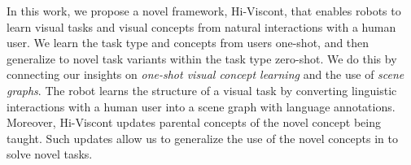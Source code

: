 In this work, we propose a novel framework, Hi-Viscont, that enables robots to learn visual tasks and visual concepts from natural interactions with a human user. We learn the task type and concepts from users one-shot, and then generalize to novel task variants within the task type zero-shot.  
We do this by connecting our insights on \emph{one-shot visual concept learning} and the use of \emph{scene graphs}. 
The robot learns the structure of a visual task by converting linguistic interactions with a human user into a scene graph with language annotations. 
Moreover, Hi-Viscont updates parental concepts of the novel concept being taught. Such updates allow us to generalize the use of the novel concepts in to solve novel tasks.



